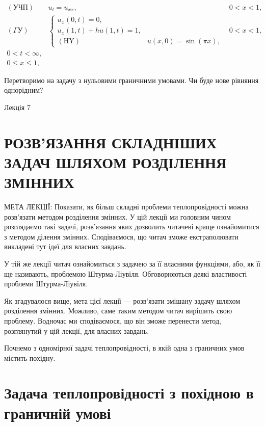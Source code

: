\documentclass[
  ukrainian,
]{article}
\begin{document}
\[
\begin{array}{ll} (\text{УЧП}) & u_t = u_{xx}, & 0 < x < 1, \\ (\Gamma \text{У}) & \begin{cases} u_x(0, t) = 0, \\ u_x(1, t) + hu(1, t) = 1, \\ (\text{HY}) & u(x, 0) = \sin(\pi x), \end{cases} & 0 < x < 1, \\ 0 < t < \infty, \\ 0 \le x \le 1, \end{array}
\]

Перетворимо на задачу з нульовими граничними умовами. Чи буде нове
рівняння однорідним?

Лекція 7

\section{РОЗВ'ЯЗАННЯ СКЛАДНІШИХ ЗАДАЧ ШЛЯХОМ РОЗДІЛЕННЯ
ЗМІННИХ}\label{ux440ux43eux437ux432ux44fux437ux430ux43dux43dux44f-ux441ux43aux43bux430ux434ux43dux456ux448ux438ux445-ux437ux430ux434ux430ux447-ux448ux43bux44fux445ux43eux43c-ux440ux43eux437ux434ux456ux43bux435ux43dux43dux44f-ux437ux43cux456ux43dux43dux438ux445}

МЕТА ЛЕКЦІЇ: Показати, як більш складні проблеми теплопровідності можна
розв'язати методом розділення змінних. У цій лекції ми головним чином
розглядаємо такі задачі, розв'язання яких дозволить читачеві краще
ознайомитися з методом ділення змінних. Сподіваємося, що читач зможе
екстраполювати викладені тут ідеї для власних завдань.

У тій же лекції читач ознайомиться з задачею за її власними функціями,
або, як її ще називають, проблемою Штурма-Ліувіля. Обговорюються деякі
властивості проблеми Штурма-Ліувіля.

Як згадувалося вище, мета цієї лекції --- розв'язати змішану задачу
шляхом розділення змінних. Можливо, саме таким методом читач вирішить
свою проблему. Водночас ми сподіваємося, що він зможе перенести метод,
розглянутий у цій лекції, для власних завдань.

Почнемо з одномірної задачі теплопровідності, в якій одна з граничних
умов містить похідну.

\section{Задача теплопровідності з похідною в граничній
умові}\label{ux437ux430ux434ux430ux447ux430-ux442ux435ux43fux43bux43eux43fux440ux43eux432ux456ux434ux43dux43eux441ux442ux456-ux437-ux43fux43eux445ux456ux434ux43dux43eux44e-ux432-ux433ux440ux430ux43dux438ux447ux43dux456ux439-ux443ux43cux43eux432ux456}
\end{document}
